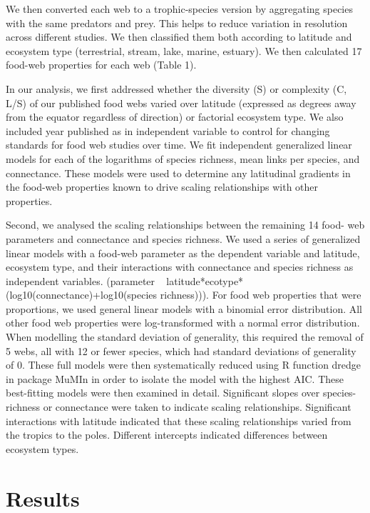 \documentclass[12pt]{article}
\begin{document}
We then converted each web to a trophic-species version by aggregating species
with the same predators and prey. This helps to reduce variation in resolution
across different studies.
We then classified them both according to latitude
and ecosystem type (terrestrial, stream, lake, marine, estuary). We then calculated 17
food-web properties for each web (Table 1).


In our analysis, we first addressed whether the diversity (S) or complexity (C, L/S) of our
published food webs varied over latitude (expressed as degrees away from the
equator regardless of direction) or factorial ecosystem type. We also included
year published as in independent variable to control for changing standards
for food web studies over time. We fit independent generalized linear models
for each of the logarithms of species richness, mean links per species, and
connectance. These models were used to determine any latitudinal gradients in the food-web
properties known to drive scaling relationships with other properties.


Second, we analysed the scaling relationships between the remaining 14 food-
web parameters and connectance and species richness. We used a series of
generalized linear models with a food-web parameter as the dependent variable
and latitude, ecosystem type, and their interactions with connectance and
species richness as independent variables. (parameter ~
latitude*ecotype*(log10(connectance)+log10(species richness))). For food web
properties that were proportions, we used general linear models with a
binomial error distribution. All other food web properties were log-transformed with a normal error distribution.
When modelling the standard deviation of generality, this
required the removal of 5 webs, all with 12 or fewer species, which had
standard deviations of generality of 0. These full models were then
systematically reduced using R function dredge \cite{} in package MuMIn
\cite{} in order to isolate the model with the highest AIC. These best-fitting models were 
then examined in detail. Significant slopes over species-richness or connectance were taken to indicate scaling
relationships. Significant interactions with latitude indicated that these scaling relationships varied from the tropics
to the poles. Different intercepts indicated differences between ecosystem types.


\section*{Results}
\end{document}

